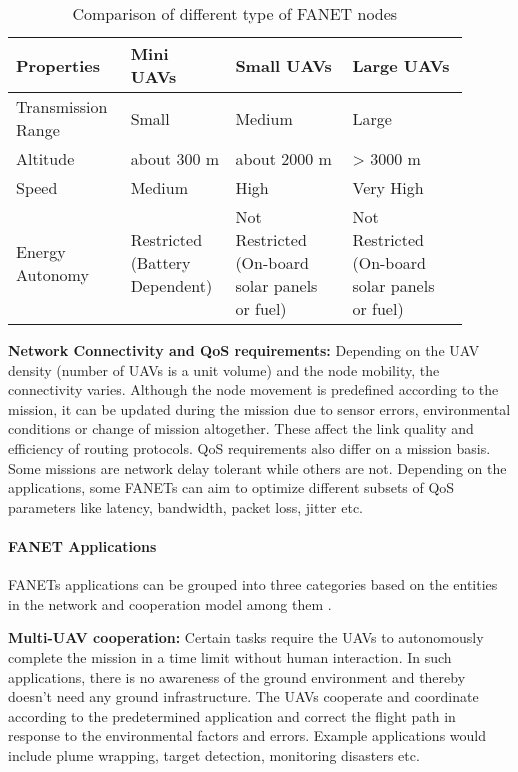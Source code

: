 \begin{table}
\caption{Comparison of different type of FANET nodes}
\label{tab:uav_comparison}
\begin{tabular}{|p{0.21\linewidth}|p{0.21\linewidth}|p{0.24\linewidth}|p{0.24\linewidth}|}
\toprule
Properties & Mini UAVs & Small UAVs & Large UAVs\\
\midrule
Transmission Range & Small & Medium & Large\\
\midrule
Altitude 	&  about 300 m   & about 2000 m  &  > 3000 m \\
\midrule
Speed & Medium & High & Very High \\
\midrule
Energy Autonomy & Restricted (Battery Dependent) & Not Restricted (On-board solar panels or fuel) &  Not Restricted (On-board solar panels or fuel) \\
\bottomrule
\end{tabular}
\end{table}

\textbf{Network Connectivity and QoS requirements:} Depending on the UAV density (number of UAVs is a unit volume) and the node mobility, the connectivity varies. Although the node movement is predefined according to the mission, it can be updated during the mission due to sensor errors, environmental conditions or change of mission altogether. These affect the link quality and efficiency of routing protocols. QoS requirements also differ on a mission basis. Some missions are network delay tolerant while others are not. Depending on the applications, some FANETs can aim to optimize different subsets of QoS parameters like latency, bandwidth, packet loss, jitter etc.

\paragraph{FANET Applications}
FANETs applications can be grouped into three categories based on the entities in the network and cooperation model among them \cite{BEKMEZCI20131254}.

\textbf{Multi-UAV cooperation:} Certain tasks require the UAVs to autonomously complete the mission in a time limit without human interaction. In such applications, there is no awareness of the ground environment and thereby doesn't need any ground infrastructure. The UAVs cooperate and coordinate according to the predetermined application and correct the flight path in response to the environmental factors and errors. Example applications would include plume wrapping, target detection, monitoring disasters etc. 

